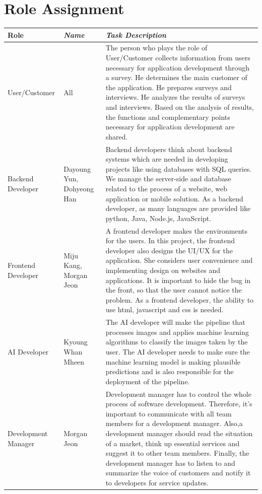 \documentclass[conference]{IEEEtran}
\begin{document}
\section*{Role Assignment}
\begin{table}[h!]
\begin{tabular}{|p{}|p{}|p{}|}
\cline{1-3} 
\textbf{Role} & \textbf{\textit{Name}}& \textbf{\textit{Task Description}}\\
\hline
User/Customer&All&The person who plays the role of User/Customer collects information from users necessary for application development through a survey. He determines the main customer of the application. He prepares surveys and interviews. He analyzes the results of surveys and interviews. Based on the analysis of results, the functions and complementary points necessary for application development are shared. \\
\hline
Backend Developer&Dayoung Yun, Dohyeong Han&Backend developers think about backend systems which are needed in developing projects like using databases with SQL queries. We manage the server-side and database related to the process of a website, web application or mobile solution. As a backend developer, as many languages are provided like python, Java, Node.js, JavaScript.\\
\hline
Frontend Developer&Miju Kang,
Morgan Jeon&A frontend developer makes the environments for the users. In this project, the frontend developer also designs the UI/UX for the application. She considers user convenience and implementing design on websites and applications. It is important to hide the bug in the front, so that the user cannot notice the problem. As a frontend developer, the ability to use html, javascript and css is needed.\\
\hline
AI Developer&Kyoung Whan Mheen&The AI developer will make the pipeline that processes images and applies machine learning algorithms to classify the images taken by the user. The AI developer needs to make sure the machine learning model is making plausible predictions and is also responsible for the deployment of the pipeline.\\
\hline
Development Manager&Morgan Jeon&Development manager has to control the whole process of  software development. Therefore, it’s important to communicate with all team members for a development manager. Also,a development manager should read the situation of a market, think up essential services and suggest it to other team members. Finally, the development manager has to listen to and summarize the voice of customers and notify it to developers for service updates.\\
\hline

\end{tabular}
\end{table}
\end{document}
